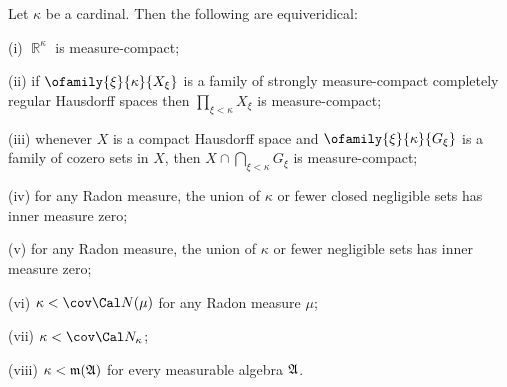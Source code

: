  Let $\kappa$
be a cardinal.   Then the following are equiveridical:

(i) $\BbbR^{\kappa}$ is measure-compact;

(ii) if $\ofamily{\xi}{\kappa}{X_{\xi}}$ is a family of strongly
measure-compact completely regular Hausdorff spaces then
$\prod_{\xi<\kappa}X_{\xi}$ is measure-compact;

(iii) whenever $X$ is a compact Hausdorff space and
$\ofamily{\xi}{\kappa}{G_{\xi}}$ is a family of cozero sets in $X$, then
$X\cap\bigcap_{\xi<\kappa}G_{\xi}$ is measure-compact;

(iv) for any Radon measure, the union of $\kappa$ or fewer closed
negligible sets has inner measure zero;

(v) for any Radon measure, the union of $\kappa$ or fewer
negligible sets has inner measure zero;

(vi) $\kappa<\cov\Cal N(\mu)$ for any Radon measure $\mu$;

(vii) $\kappa<\cov\Cal N_{\kappa}$;

(viii) $\kappa<\frak m(\frak A)$ for every measurable algebra $\frak A$.

